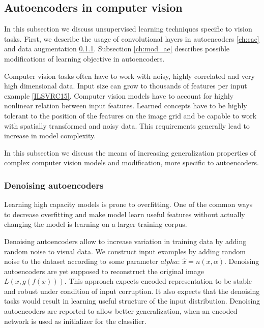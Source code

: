 


\subsection{Autoencoders in computer vision}\label{ch:dcae}

In this subsection we discuss unsupervised learning techniques specific to vision tasks.
First, we describe the usage of convolutional layers in autoencoders \ref{ch:cae} and data augmentation \ref{ch:denae}.
Subsection \ref{ch:mod_ae} describes possible modifications of learning objective in autoencoders.

Computer vision tasks often have to work with noisy, highly correlated and very high dimensional data. Input size can grow to thousands of features per input example \ref{ILSVRC15}.
Computer vision models have to account for highly nonlinear relation between input features.
Learned concepts have to be highly tolerant to the position of the features on the image grid and be capable to work with spatially transformed and noisy data.
This requirements generally lead to increase in model complexity.

In this subsection we discuss the means of increasing generalization properties of complex computer vision models and modification, more specific to autoencoders.

\subsubsection{Denoising autoencoders}\label{ch:denae}

Learning high capacity models is prone to overfitting.
One of the common ways to decrease overfitting and make model learn useful features without actually changing the model is learning on a larger training corpus.

Denoising autoencoders \cite{Vincent2010} allow to increase variation in training data by adding random noise to visual data. We construct input examples by adding random noise to the dataset according to some parameter $alpha$: $\hat{x}=n(x, \alpha)$.
Denoising autoencoders are yet supposed to reconstruct  the original image $L(x, g(f(x)))$.
This approach expects encoded representation to be stable and robust under condition of input corruption.
It also expects that the denoising tasks would result in learning useful structure of the input distribution.
Denoising autoencoders are reported to allow better generalization, when an encoded network is used as initializer for the classifier.

